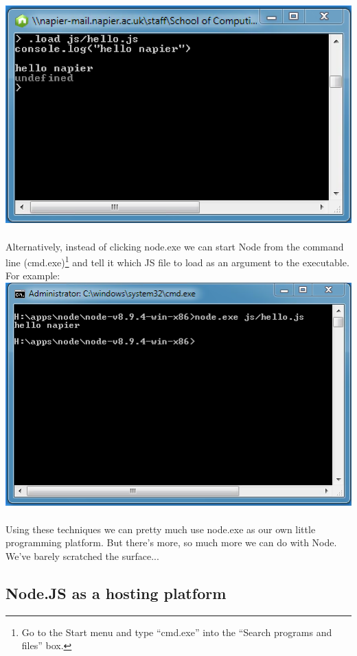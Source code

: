 \documentclass[10pt, a4paper, twosize]{article}
\begin{document}
\includegraphics[width=.8\textwidth]{images/node_repl_external-file}

\paragraph{} Alternatively, instead of clicking node.exe we can start Node from the command line (cmd.exe)\footnote{Go to the Start menu and type ``cmd.exe'' into the ``Search programs and files'' box.} and tell it which JS file to load as an argument to the executable. For example:\\

\includegraphics[width=.8\textwidth]{images/node_external-file}

\paragraph{} Using these techniques we can pretty much use node.exe as our own little programming platform. But there's more, so much more we can do with Node. We've barely scratched the surface...

\subsection{Node.JS as a hosting platform}
\end{document}

